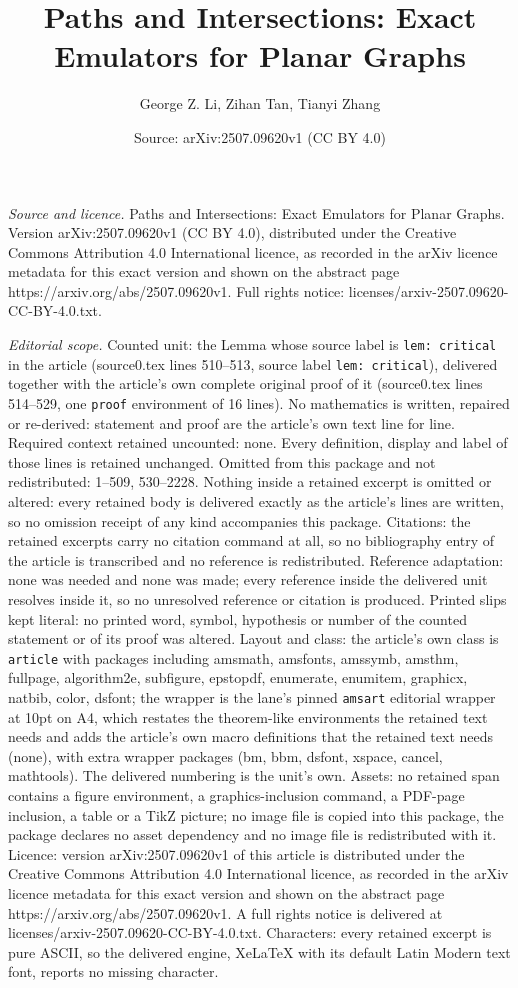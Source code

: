 \documentclass[10pt,a4paper]{amsart}
\title[Paths and Intersections: Exact Emulators for Planar Graphs]{Paths and Intersections: Exact Emulators for Planar Graphs}
\author{George Z. Li, Zihan Tan, Tianyi Zhang}
\date{Source: arXiv:2507.09620v1 (CC BY 4.0)}
\begin{document}
\maketitle

\noindent\emph{Source and licence.} Paths and Intersections: Exact Emulators for Planar Graphs. Version arXiv:2507.09620v1 (CC BY 4.0), distributed under the Creative Commons Attribution 4.0 International licence, as recorded in the arXiv licence metadata for this exact version and shown on the abstract page https://arxiv.org/abs/2507.09620v1. Full rights notice: licenses/arxiv-2507.09620-CC-BY-4.0.txt.\par\smallskip

\noindent\textit{Editorial scope.} Counted unit: the Lemma whose source label is \texttt{lem: critical} in the article (source0.tex lines 510--513, source label \texttt{lem: critical}), delivered together with the article's own complete original proof of it (source0.tex lines 514--529, one \texttt{proof} environment of 16 lines). No mathematics is written, repaired or re-derived: statement and proof are the article's own text line for line. Required context retained uncounted: none. Every definition, display and label of those lines is retained unchanged. Omitted from this package and not redistributed: 1--509, 530--2228. Nothing inside a retained excerpt is omitted or altered: every retained body is delivered exactly as the article's lines are written, so no omission receipt of any kind accompanies this package. Citations: the retained excerpts carry no citation command at all, so no bibliography entry of the article is transcribed and no reference is redistributed. Reference adaptation: none was needed and none was made; every reference inside the delivered unit resolves inside it, so no unresolved reference or citation is produced. Printed slips kept literal: no printed word, symbol, hypothesis or number of the counted statement or of its proof was altered. Layout and class: the article's own class is \texttt{article} with packages including amsmath, amsfonts, amssymb, amsthm, fullpage, algorithm2e, subfigure, epstopdf, enumerate, enumitem, graphicx, natbib, color, dsfont; the wrapper is the lane's pinned \texttt{amsart} editorial wrapper at 10pt on A4, which restates the theorem-like environments the retained text needs and adds the article's own macro definitions that the retained text needs (none), with extra wrapper packages (bm, bbm, dsfont, xspace, cancel, mathtools). The delivered numbering is the unit's own. Assets: no retained span contains a figure environment, a graphics-inclusion command, a PDF-page inclusion, a table or a TikZ picture; no image file is copied into this package, the package declares no asset dependency and no image file is redistributed with it. Licence: version arXiv:2507.09620v1 of this article is distributed under the Creative Commons Attribution 4.0 International licence, as recorded in the arXiv licence metadata for this exact version and shown on the abstract page https://arxiv.org/abs/2507.09620v1. A full rights notice is delivered at licenses/arxiv-2507.09620-CC-BY-4.0.txt. Characters: every retained excerpt is pure ASCII, so the delivered engine, XeLaTeX with its default Latin Modern text font, reports no missing character.
\end{document}
